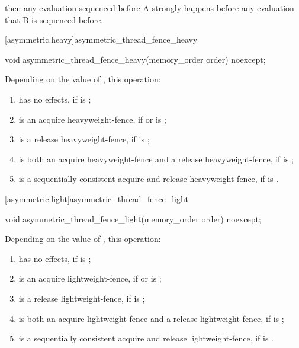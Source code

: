 then any evaluation sequenced before A strongly happens before any evaluation that B is
sequenced before.


[asymmetric.heavy]{asymmetric_thread_fence_heavy}
\begin{itemdecl}
void asymmetric_thread_fence_heavy(memory_order order) noexcept;
\end{itemdecl}

\begin{itemdescr}


\effects
Depending on the value of , this operation:
\begin{enumerate}
    \item  has no effects, if  is ;
\item  is an acquire heavyweight-fence, if  or  is ;
\item is a release heavyweight-fence, if  is ;
\item is both an acquire heavyweight-fence and a release heavyweight-fence, if  is ;
\item is a sequentially consistent acquire and release heavyweight-fence, if  is .
\end{enumerate}

\end{itemdescr}

[asymmetric.light]{asymmetric_thread_fence_light}
\begin{itemdecl}
void asymmetric_thread_fence_light(memory_order order) noexcept;
\end{itemdecl}

\begin{itemdescr}


\effects
Depending on the value of , this operation:
\begin{enumerate}

    \item  has no effects, if  is ;
\item  is an acquire lightweight-fence, if  or  is ;
\item is a release lightweight-fence, if  is ;
\item is both an acquire lightweight-fence and a release lightweight-fence, if  is ;
\item is a sequentially consistent acquire and release lightweight-fence, if  is .
\end{enumerate}

\end{itemdescr}




